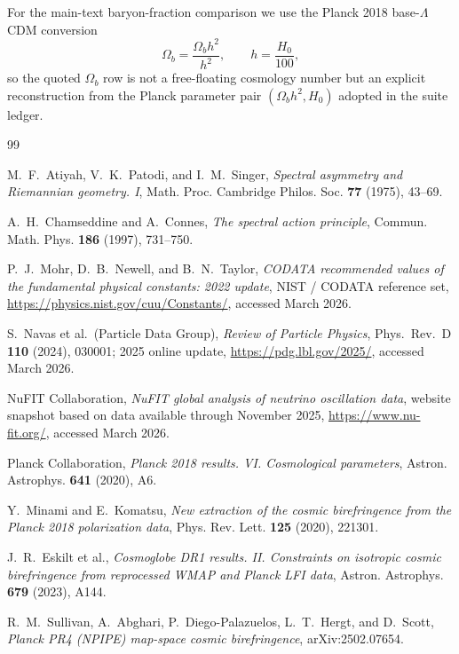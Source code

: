 For the main-text baryon-fraction comparison we use the Planck 2018 base-$\Lambda$CDM conversion
\[
\Omega_b=\frac{\Omega_b h^2}{h^2},
\qquad
h=\frac{H_0}{100},
\]
so the quoted $\Omega_b$ row is not a free-floating cosmology number but an explicit reconstruction from the Planck parameter pair $(\Omega_b h^2,H_0)$ adopted in the suite ledger.

\begin{thebibliography}{99}

M.~F.~Atiyah, V.~K.~Patodi, and I.~M.~Singer,
\newblock \emph{Spectral asymmetry and Riemannian geometry. I},
\newblock Math. Proc. Cambridge Philos. Soc. \textbf{77} (1975), 43--69.

A.~H.~Chamseddine and A.~Connes,
\newblock \emph{The spectral action principle},
\newblock Commun. Math. Phys. \textbf{186} (1997), 731--750.

P.~J.~Mohr, D.~B.~Newell, and B.~N.~Taylor,
\newblock \emph{CODATA recommended values of the fundamental physical constants: 2022 update},
\newblock NIST / CODATA reference set, \url{https://physics.nist.gov/cuu/Constants/}, accessed March 2026.

S.~Navas et al.\ (Particle Data Group),
\newblock \emph{Review of Particle Physics},
\newblock Phys.\ Rev.\ D \textbf{110} (2024), 030001; 2025 online update, \url{https://pdg.lbl.gov/2025/}, accessed March 2026.

NuFIT Collaboration,
\newblock \emph{NuFIT global analysis of neutrino oscillation data},
\newblock website snapshot based on data available through November 2025, \url{https://www.nu-fit.org/}, accessed March 2026.

Planck Collaboration,
\newblock \emph{Planck 2018 results. VI. Cosmological parameters},
\newblock Astron. Astrophys. \textbf{641} (2020), A6.

Y.~Minami and E.~Komatsu,
\newblock \emph{New extraction of the cosmic birefringence from the Planck 2018 polarization data},
\newblock Phys. Rev. Lett. \textbf{125} (2020), 221301.

J.~R.~Eskilt et al.,
\newblock \emph{Cosmoglobe DR1 results. II. Constraints on isotropic cosmic birefringence from reprocessed WMAP and Planck LFI data},
\newblock Astron. Astrophys. \textbf{679} (2023), A144.

R.~M.~Sullivan, A.~Abghari, P.~Diego-Palazuelos, L.~T.~Hergt, and D.~Scott,
\newblock \emph{Planck PR4 (NPIPE) map-space cosmic birefringence},
\newblock arXiv:2502.07654.

\end{thebibliography}


